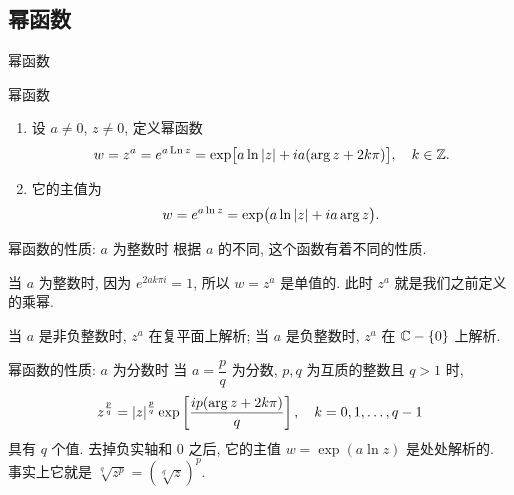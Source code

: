 \subsection{幂函数}
	\begin{frame}{幂函数}
	\onslide<+->
	\begin{alertblock}{幂函数}
		\begin{enumerate}
			\item 设 $a\neq 0$, $z\neq 0$, 定义幂函数
			\[w=z^a=e^{a\operatorname{Ln} z}
			=\exp\bigl[a\ln\left|z\right|+ia(\arg z+2k\pi)\bigr],\quad k\in{\mathbb{Z}}.\]
			\item 它的主值为
			\[w=e^{a\ln z}=\exp\bigl(a\ln\left|z\right|+ia\arg z\bigr).\]
		\end{enumerate}
		\vspace{-\baselineskip}
	\end{alertblock}
\end{frame}


\begin{frame}{幂函数的性质: $a$ 为整数时}
	\onslide<+->
	根据 $a$ 的不同, 这个函数有着不同的性质.

	\onslide<+->
	当 $a$ 为整数时, 因为 $e^{2ak\pi i}=1$, 所以 $w=z^a$ 是单值的.
	\onslide<+->
	此时 $z^a$ 就是我们之前定义的乘幂.

	\onslide<+->
	当 $a$ 是非负整数时, $z^a$ 在复平面上解析;
	\onslide<+->
	当 $a$ 是负整数时, $z^a$ 在 ${\mathbb{C}}-{\left\{0\right\}}$ 上解析.
\end{frame}


\begin{frame}{幂函数的性质: $a$ 为分数时}
	\onslide<+->
	当 $a=\dfrac pq$ 为分数, $p,q$ 为互质的整数且 $q>1$ 时,
	\onslide<+->
	\[z^{\frac pq}=\left|z\right|^{\frac pq}\exp\left[\frac{ip(\arg z+2k\pi)}q\right],\quad k=0,1,\dots,q-1\]
	具有 $q$ 个值.
	\onslide<+->
	去掉负实轴和 $0$ 之后, 它的主值 $w=\exp(a\ln z)$ 是处处解析的.
	\onslide<+->
	事实上它就是 $\sqrt[q]{z^p}=(\sqrt[q]z)^p$.
	\onslide<+->
	\begin{center}
	\end{center}
\end{frame}



